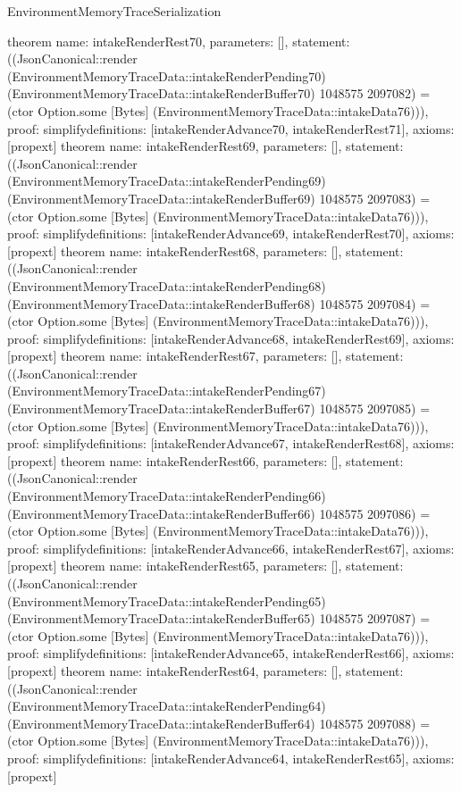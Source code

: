 \begin{lexlean}{EnvironmentMemoryTraceSerialization}
\begin{semanticmodule}
{}
theorem{
 name: intakeRenderRest70, parameters: [],
 statement: ((JsonCanonical::render (EnvironmentMemoryTraceData::intakeRenderPending70) (EnvironmentMemoryTraceData::intakeRenderBuffer70) 1048575 2097082) = (ctor Option.some [Bytes] (EnvironmentMemoryTraceData::intakeData76))), proof: simplify{definitions: [intakeRenderAdvance70, intakeRenderRest71]}, axioms: [propext]
}
theorem{
 name: intakeRenderRest69, parameters: [],
 statement: ((JsonCanonical::render (EnvironmentMemoryTraceData::intakeRenderPending69) (EnvironmentMemoryTraceData::intakeRenderBuffer69) 1048575 2097083) = (ctor Option.some [Bytes] (EnvironmentMemoryTraceData::intakeData76))), proof: simplify{definitions: [intakeRenderAdvance69, intakeRenderRest70]}, axioms: [propext]
}
theorem{
 name: intakeRenderRest68, parameters: [],
 statement: ((JsonCanonical::render (EnvironmentMemoryTraceData::intakeRenderPending68) (EnvironmentMemoryTraceData::intakeRenderBuffer68) 1048575 2097084) = (ctor Option.some [Bytes] (EnvironmentMemoryTraceData::intakeData76))), proof: simplify{definitions: [intakeRenderAdvance68, intakeRenderRest69]}, axioms: [propext]
}
theorem{
 name: intakeRenderRest67, parameters: [],
 statement: ((JsonCanonical::render (EnvironmentMemoryTraceData::intakeRenderPending67) (EnvironmentMemoryTraceData::intakeRenderBuffer67) 1048575 2097085) = (ctor Option.some [Bytes] (EnvironmentMemoryTraceData::intakeData76))), proof: simplify{definitions: [intakeRenderAdvance67, intakeRenderRest68]}, axioms: [propext]
}
theorem{
 name: intakeRenderRest66, parameters: [],
 statement: ((JsonCanonical::render (EnvironmentMemoryTraceData::intakeRenderPending66) (EnvironmentMemoryTraceData::intakeRenderBuffer66) 1048575 2097086) = (ctor Option.some [Bytes] (EnvironmentMemoryTraceData::intakeData76))), proof: simplify{definitions: [intakeRenderAdvance66, intakeRenderRest67]}, axioms: [propext]
}
theorem{
 name: intakeRenderRest65, parameters: [],
 statement: ((JsonCanonical::render (EnvironmentMemoryTraceData::intakeRenderPending65) (EnvironmentMemoryTraceData::intakeRenderBuffer65) 1048575 2097087) = (ctor Option.some [Bytes] (EnvironmentMemoryTraceData::intakeData76))), proof: simplify{definitions: [intakeRenderAdvance65, intakeRenderRest66]}, axioms: [propext]
}
theorem{
 name: intakeRenderRest64, parameters: [],
 statement: ((JsonCanonical::render (EnvironmentMemoryTraceData::intakeRenderPending64) (EnvironmentMemoryTraceData::intakeRenderBuffer64) 1048575 2097088) = (ctor Option.some [Bytes] (EnvironmentMemoryTraceData::intakeData76))), proof: simplify{definitions: [intakeRenderAdvance64, intakeRenderRest65]}, axioms: [propext]
}
\end{semanticmodule}
\end{lexlean}

